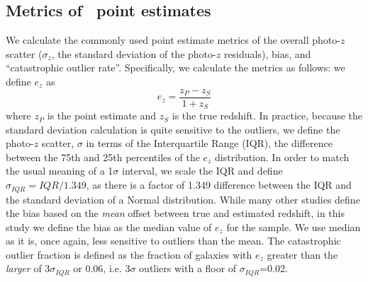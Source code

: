 \subsection{Metrics of \pz\ point estimates}
\label{sec:point_metrics}

We calculate the commonly used point estimate metrics of the overall photo-$z$ scatter ($\sigma_{z}$, the standard deviation of the photo-$z$ residuals), bias, and ``catastrophic outlier rate''.
Specifically, we calculate the metrics as follows:
we define $e_{z}$ as
\begin{equation}
e_{z} = \frac{z_{P} -z_{S}}{1+z_{S}}
\end{equation}
where $z_{P}$ is the point estimate and $z_{S}$ is the true redshift.
In practice, because the standard deviation calculation is quite sensitive to the outliers, we define the photo-$z$ scatter, $\sigma$ in terms of the Interquartile Range (IQR), the difference between the 75th and 25th percentiles of the $e_{z}$ distribution.
In order to match the usual meaning of a 1$\sigma$ interval, we scale the IQR and define $\sigma_{IQR} = IQR/1.349$, as there is a factor of 1.349 difference between the IQR and the standard deviation of a Normal distribution.
While many other studies define the bias based on the {\it mean} offset between true and estimated redshift, in this study we define the bias as the median value of $e_{z}$ for the sample.
We use median as it is, once again, less sensitive to outliers than the mean.
The catastrophic outlier fraction is defined as the fraction of galaxies with $e_{z}$ greater than the {\it larger} of $3\sigma_{IQR}$ or 0.06, i.e. 3$\sigma$ outliers with a floor of $\sigma_{IQR}$=0.02.
